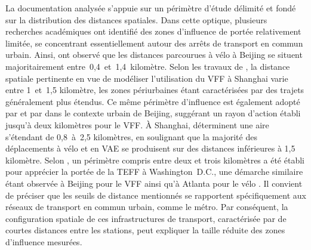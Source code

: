 \begin{refsegment}
La documentation analysée s'appuie sur un périmètre d'étude délimité et fondé sur la distribution des distances spatiales. Dans cette optique, plusieurs recherches académiques ont identifié des zones d'influence de portée relativement limitée, se concentrant essentiellement autour des arrêts de transport en commun urbain. Ainsi, \textcolor{blue}{\textcite[5]{wang_interchange_2016}} ont observé que les distances parcourues à vélo à Beijing se situent majoritairement entre~0,4~et~1,4~kilomètre. Selon les travaux de \textcolor{blue}{\textcite[11]{hu_examining_2022}}, la distance spatiale pertinente en vue de modéliser l'utilisation du \acrshort{VFF} à Shanghai varie entre 1~et~1,5 kilomètre, les zones périurbaines étant caractérisées par des trajets généralement plus étendus. Ce même périmètre d'influence est également adopté par \textcolor{blue}{\textcite[9]{jin_competition_2019}} et par \textcolor{blue}{\textcite[10]{fan_how_2019}} dans le contexte urbain de Beijing, suggérant un rayon d'action établi jusqu'à deux kilomètres pour le \acrshort{VFF}. À Shanghai, \textcolor{blue}{\textcite[185]{pan_intermodal_2010}} déterminent une aire s'étendant de 0,8~à~2,5 kilomètres, en soulignant que la majorité des déplacements à vélo et en \acrshort{VAE} se produisent sur des distances inférieures à 1,5 kilomètre. Selon \textcolor{blue}{\textcite[5]{ma_connecting_2022}}, un périmètre compris entre deux et trois kilomètres a été établi pour apprécier la portée de la \acrshort{TEFF} à Washington~D.C., une démarche similaire étant observée à Beijing pour le \acrshort{VFF} \textcolor{blue}{\autocite[6]{ma_connecting_2022}} ainsi qu'à Atlanta pour le vélo \textcolor{blue}{\autocite[57]{bearn_adaption_2018}}. Il convient de préciser que les seuils de distance mentionnés se rapportent spécifiquement aux réseaux de transport en commun urbain, comme le métro. Par conséquent, la configuration spatiale de ces infrastructures de transport, caractérisée par de courtes distances entre les stations, peut expliquer la taille réduite des zones d'influence mesurées.%


\end{refsegment}
